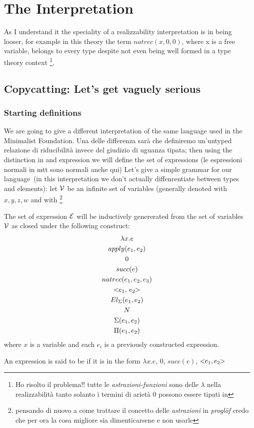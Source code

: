\chapter{The Interpretation}
	As I understand it the speciality of a 
	realizzability 	interpretation is in 
	being looser, for example in this theory
	the term $natrec(x, 0, 0)$, where x is a 
	free variable, belongs to every type despite 
	not even being well formed in a type theory context \footnote{Ho risolto il  problema!! tutte le \emph{astrazioni-funzioni} sono delle $\lambda$ nella realizzabilità tanto solanto i termini di arietà 0 possono essere tipati in }.



\section{Copycatting: Let's get vaguely serious}
	\subsection{Starting definitions}
		We are going to give a different interpretation 
		of the same language used in the Minimalist 
		Foundation. Una delle differenza sarà che definiremo
		un'untyped relazione di riducibilità invece 
		del giudizio di uguanza tipata; then using the distinction in  and  expression we will define the set of  expressions (le espressioni normali in mtt sono normali anche qui)
		Let's give a simple grammar for our language~(in this interpretation we don't actually diffenrentiate between types and elements): let $\Va$ be an infinite set of variables (generally denoted with $x,y,z,w$ and with \footnote{pensando di nuovo a come trattare il concetto delle \emph{astrazioni} in \textsl{proglöf} credo che per ora la cosa migliore sia dimenticarsene e non usarle}		
\begin{dede}
	The set of expression $\Ve$ will be inductively genererated from the set of variables $\Va$ as closed under the following construct:
	\begin{gather}
	 \lambda x.e \\
	 apply(e_1,e_2) \\
	 0 \\ 
	 succ(e) \\ 
	 natrec(e_1,e_2,e_3) \\ 
	 \cp[e_1,\,e_2] \\
	 El_\Sigma(e_1, e_2) \\
	 N 		\\
	 \Sigma(e_1,e_2)\\
	 \Pi(e_1,e_2)
	\end{gather}
	where $x$ is a variable and each $e_i$ is a previously constructed expression.
	\end{dede}
	\begin{dede}
		An expression is said to be  if it is in the form $\lambda x.e$, 0, $succ(e)$, $\cp[e_1,e_2]$ 
	\end{dede}
	
